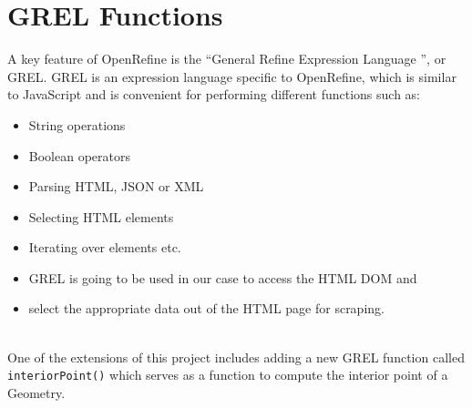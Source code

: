 \section{GREL Functions}
A key feature of OpenRefine is the \textquotedblleft General Refine Expression Language \textquotedblright, or GREL.
GREL is an expression language specific to OpenRefine, which is similar to JavaScript and is convenient for performing different functions such as:
\begin{itemize}
    \item String operations
    \item Boolean operators
    \item Parsing HTML, JSON or XML
    \item Selecting HTML elements
    \item Iterating over elements etc.
    \item GREL is going to be used in our case to access the HTML DOM and
    \item select the appropriate data out of the HTML page for scraping.
\end{itemize} \cite{OpenRefineCoreDump}\\
\newline
One of the extensions of this project includes adding a new GREL function called \texttt{interiorPoint()}
which serves as a function to compute the interior point of a Geometry.